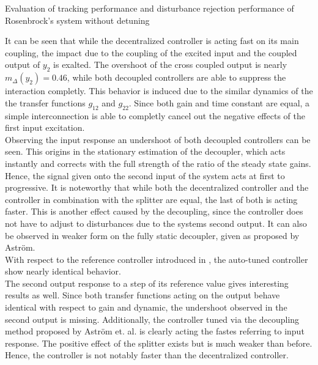 \begin{table}[H]
\centering
\caption{Evaluation of tracking performance and disturbance rejection performance of Rosenbrock's system without detuning}
\label{c:fotd:s:rosenbrock:tab:eval1}

\end{table}
It can be seen that while the decentralized controller is acting fast on its main coupling, the impact due to the coupling of the excited input and the coupled output of $y_2$ is exalted. The overshoot of the cross coupled output is nearly $m_{\Delta}(y_2) = 0.46$, while both decoupled controllers are able to suppress the interaction completly. This behavior is induced due to the similar dynamics of the the transfer functions $g_{12}$ and $g_{22}$. Since both gain and time constant are equal, a simple interconnection is able to completly cancel out the negative effects of the first input excitation.\\

Observing the input response an undershoot of both decoupled controllers can be seen. This origins in the stationary estimation of the decoupler, which acts instantly and corrects with the full strength of the ratio of the steady state gains. Hence, the signal given onto the second input of the system acts at first to progressive. It is noteworthy that while both the decentralized controller and the controller in combination with the splitter are equal, the last of both is acting faster. This is another effect caused by the decoupling, since the controller does not have to adjust to disturbances due to the systems second output. It can also be observed in weaker form on the fully static decoupler, given as proposed by Astr\"om.\\

With respect to the reference controller introduced in \cite{Astrom2001a}, the auto-tuned controller show nearly identical behavior.\\

The second output response to a step of its reference value gives interesting results as well. Since both transfer functions acting on the output behave identical with respect to gain and dynamic, the undershoot observed in the second output is missing. Additionally, the controller tuned via the decoupling method proposed by Astr\"om et. al. is clearly acting the fastes referring to input response. The positive effect of the splitter exists but is much weaker than before. Hence, the controller is not notably faster than the decentralized controller.\\

